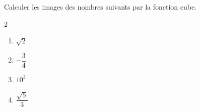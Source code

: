 \exo
Calculer les images des nombres suivants par la fonction cube.
\setlength{\columnseprule}{0pt}
\begin{multicols}{2}
\begin{enumerate}
\item $\sqrt{2}$
\item $-\dfrac{3}{4}$
\item $10^3$
\item $\dfrac{\sqrt{5}}{3}$
\end{enumerate}
\end{multicols}
